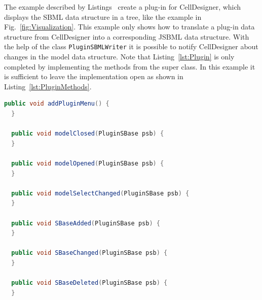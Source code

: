 \documentclass[
  BCOR12mm,
  letterpaper,
  11pt,
  headsepline,
  pointlessnumbers,
  tablecaptionabove,
  headinclude,
  appendixprefix,
  idxtotoc,
  bibtotoc,
  twoside,
  titlepage
]{scrartcl}
\begin{document}
The example described by Listings~
create a plug-in for CellDesigner, which displays the SBML data structure
in a tree, like the example in Fig.~\vref{fig:Visualization}. This example only
shows how to translate a plug-in data structure
from CellDesigner into a corresponding JSBML data structure. With the help of
the class \verb!PluginSBMLWriter! it is possible to notify CellDesigner about
changes in the model data structure. Note that Listing~\vref{lst:Plugin} is only
completed by implementing the methods from the super class. In this example it
is sufficient to leave the implementation open as shown in
Listing~\vref{lst:PluginMethods}.
\begin{lstlisting}[language=Java,float,caption={Empty implementation of the
methods from the abstract class \texttt{CellDesignerPlugin}},
label=lst:PluginMethods]
  public void addPluginMenu() {
  }

  public void modelClosed(PluginSBase psb) {
  }

  public void modelOpened(PluginSBase psb) {
  }

  public void modelSelectChanged(PluginSBase psb) {
  }

  public void SBaseAdded(PluginSBase psb) {
  }

  public void SBaseChanged(PluginSBase psb) {
  }

  public void SBaseDeleted(PluginSBase psb) {
  }
\end{lstlisting}



\end{document}
